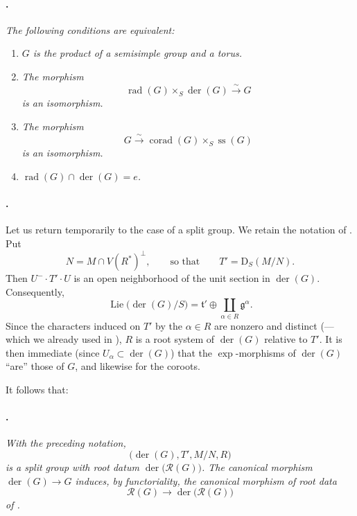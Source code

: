 \paragraph{.}
\textit{The following conditions are equivalent:}
\begin{enumerate}
\item[\textup{(i)}]
\textit{\(G\) is the product of a semisimple group and a torus.}

\item[\textup{(ii)}]
\textit{The morphism}
\[
  \operatorname{rad}(G)\times_S\operatorname{der}(G)
  \xrightarrow{\ \sim\ }G
\]
\textit{is an isomorphism.}

\item[\textup{(iii)}]
\textit{The morphism}
\[
  G\xrightarrow{\ \sim\ }
  \operatorname{corad}(G)\times_S\operatorname{ss}(G)
\]
\textit{is an isomorphism.}

\item[\textup{(iv)}]
\textit{\(\operatorname{rad}(G)\cap\operatorname{der}(G)=e\).}
\end{enumerate}

\paragraph{.}
Let us return temporarily to the case of a split group. We retain
the notation of . Put
\[
  N=M\cap V(R^*)^\perp,
  \qquad\text{so that}\qquad
  T'=\mathrm D_S(M/N).
\]
Then \(U^-\cdot T'\cdot U\) is an open neighborhood of the unit
section in \(\operatorname{der}(G)\). Consequently,
\[
  \operatorname{Lie}\bigl(\operatorname{der}(G)/S\bigr)
  =
  \mathfrak t'\oplus
  \coprod_{\alpha\in R}\mathfrak g^\alpha.
\]
Since the characters induced on \(T'\) by the
\(\alpha\in R\) are nonzero and distinct
\textup{(---which we already used in )},
\(R\) is a root system of \(\operatorname{der}(G)\) relative to
\(T'\). It is then immediate \textup{(since
\(U_\alpha\subset\operatorname{der}(G)\))} that the
\(\exp\)-morphisms of \(\operatorname{der}(G)\) ``are'' those of
\(G\), and likewise for the coroots.

It follows that:

\paragraph{.}
\textit{With the preceding notation,}
\[
  \bigl(\operatorname{der}(G),T',M/N,R\bigr)
\]
\textit{is a split group with root datum
\(\operatorname{der}\bigl(\mathcal R(G)\bigr)\). The canonical
morphism \(\operatorname{der}(G)\to G\) induces, by functoriality,
the canonical morphism of root data}
\[
  \mathcal R(G)\longrightarrow
  \operatorname{der}\bigl(\mathcal R(G)\bigr)
\]
\textit{of .}


